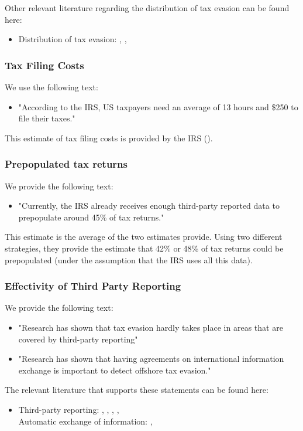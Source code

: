 \documentclass[11pt]{article}
\begin{document}
\noindent Other relevant literature regarding the distribution of tax evasion can be found here: 
\begin{itemize}
    \item Distribution of tax evasion: \textcite{johns2010distribution}, \textcite{alstadsaeter2019tax}, \textcite{guyton2021tax}  
\end{itemize}
\subsubsection*{Tax Filing Costs}
We use the following text: 
\begin{itemize}
    \item "According to the IRS, US taxpayers need an average of 13 hours and \$250 to file their taxes."
\end{itemize}
This estimate of tax filing costs is provided by the IRS (\cite{IRS2022}). 
\subsubsection*{Prepopulated tax returns}
We provide the following text:
\begin{itemize}
    \item "Currently, the IRS already receives enough third-party reported data to prepopulate around 45\% of tax returns." 
\end{itemize}    
This estimate is the average of the two estimates \cite{goodman2023automated} provide. Using two different strategies, they provide the estimate that 42\% or 48\% of tax returns could be prepopulated (under the assumption that the IRS uses all this data).
\subsubsection*{Effectivity of Third Party Reporting}
We provide the following text: 
\begin{itemize}
    \item "Research has shown that tax evasion hardly takes place in areas that are covered by third-party reporting" 
    \item "Research has shown that having agreements on international information exchange is important to detect offshore tax evasion."
\end{itemize}
The relevant literature that supports these statements can be found here: 
\begin{itemize}
    \item Third-party reporting: \textcite{kleven2011unwilling}, \textcite{pomeranz2015no}, \textcite{kleven2016can}, \textcite{slemrod2017does}, \textcite{jensen2022employment} \\[0.1em]
    Automatic exchange of information: \textcite{baselgia2023compliance}, \textcite{boas2024taxing}
\end{itemize}
\end{document}
